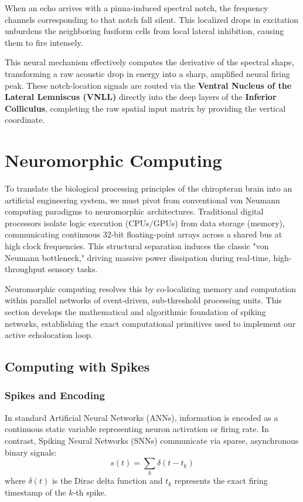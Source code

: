 When an echo arrives with a pinna-induced spectral notch, the frequency channels corresponding to that notch fall silent. This localized drops in excitation unburdens the neighboring fusiform cells from local lateral inhibition, causing them to fire intensely. 

This neural mechanism effectively computes the derivative of the spectral shape, transforming a raw acoustic drop in energy into a sharp, amplified neural firing peak. These notch-location signals are routed via the \textbf{Ventral Nucleus of the Lateral Lemniscus (VNLL)} directly into the deep layers of the \textbf{Inferior Colliculus}, completing the raw spatial input matrix by providing the vertical coordinate.










\section{Neuromorphic Computing}
To translate the biological processing principles of the chiropteran brain into an artificial engineering system, we must pivot from conventional von Neumann computing paradigms to neuromorphic architectures. Traditional digital processors isolate logic execution (CPUs/GPUs) from data storage (memory), communicating continuous 32-bit floating-point arrays across a shared bus at high clock frequencies. This structural separation induces the classic "von Neumann bottleneck," driving massive power dissipation during real-time, high-throughput sensory tasks. 

Neuromorphic computing resolves this by co-localizing memory and computation within parallel networks of event-driven, sub-threshold processing units. This section develops the mathematical and algorithmic foundation of spiking networks, establishing the exact computational primitives used to implement our active echolocation loop.

\subsection{Computing with Spikes}

\subsubsection{Spikes and Encoding}
In standard Artificial Neural Networks (ANNs), information is encoded as a continuous static variable representing neuron activation or firing rate. In contrast, Spiking Neural Networks (SNNs) communicate via sparse, asynchronous binary signals:
\begin{equation}
    s(t) = \sum_{k} \delta(t - t_k)
\end{equation}
where $\delta(t)$ is the Dirac delta function and $t_k$ represents the exact firing timestamp of the $k$-th spike. 

